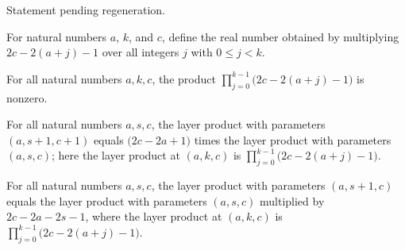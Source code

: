 \begin{theorem}
\label{FABL.gotsmanLinialExtremizer_centralLayer}
\leanok
{}
Statement pending regeneration.
\end{theorem}

\begin{definition}
\label{FABL.gotsmanLinialLayerValue}
\leanok
For natural numbers $a$, $k$, and $c$, define the real number obtained by multiplying
$2c-2(a+j)-1$ over all integers $j$ with $0 \le j < k$.
\end{definition}

\begin{theorem}
\label{FABL.gotsmanLinialLayerValue_ne_zero}
\leanok
{}
For all natural numbers $a,k,c$, the product $\prod_{j=0}^{k-1}\bigl(2c-2(a+j)-1\bigr)$
is nonzero.
\end{theorem}

\begin{theorem}
\label{FABL.gotsmanLinialLayerValue_succ_count}
\leanok
{}
For all natural numbers $a,s,c$, the layer product with parameters $(a,s+1,c+1)$ equals
$\bigl(2c-2a+1\bigr)$ times the layer product with parameters $(a,s,c)$; here the layer
product at $(a,k,c)$ is $\prod_{j=0}^{k-1}\bigl(2c-2(a+j)-1\bigr)$.
\end{theorem}

\begin{theorem}
\label{FABL.gotsmanLinialLayerValue_succ_degree}
\leanok
{}
For all natural numbers $a,s,c$, the layer product with parameters $(a,s+1,c)$ equals
the layer product with parameters $(a,s,c)$ multiplied by $2c-2a-2s-1$, where the layer
product at $(a,k,c)$ is $\prod_{j=0}^{k-1}\bigl(2c-2(a+j)-1\bigr)$.
\end{theorem}

